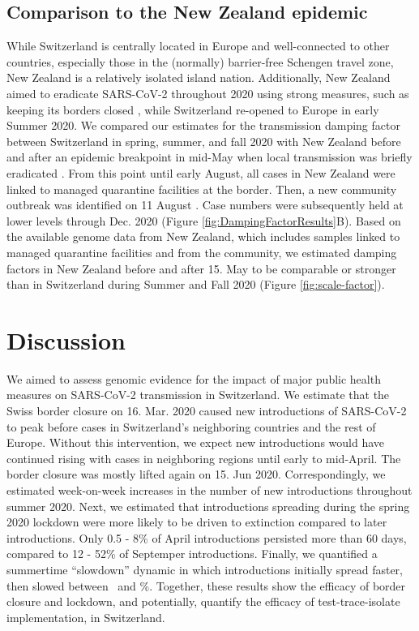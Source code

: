 \documentclass[11pt,twoside,lineno]{pnas-new} %
\begin{document}
\subsection{Comparison to the New Zealand epidemic}
While Switzerland is centrally located in Europe and well-connected to other countries, especially those in the (normally) barrier-free Schengen travel zone, New Zealand is a relatively isolated island nation. Additionally, New Zealand aimed to eradicate SARS-CoV-2 throughout 2020 using strong measures, such as keeping its borders closed \cite{ZL-covid-policies}, while Switzerland re-opened to Europe in early Summer 2020. We compared our estimates for the transmission damping factor between Switzerland in spring, summer, and fall 2020 with New Zealand before and after an epidemic breakpoint in mid-May when local transmission was briefly eradicated \cite{Geoghegan2020}. From this point until early August, all cases in New Zealand were linked to managed quarantine facilities at the border. Then, a new community outbreak was identified on 11 August \cite{Geoghegan2021-nzl-outbreak}. Case numbers were subsequently held at lower levels through Dec. 2020 (Figure \ref{fig:DampingFactorResults}B). Based on the available genome data from New Zealand, which includes samples linked to managed quarantine facilities and from the community, we estimated damping factors in New Zealand before and after 15. May to be comparable or stronger than in Switzerland during Summer and Fall 2020 (Figure \ref{fig:scale-factor}).

\section{Discussion}
We aimed to assess genomic evidence for the impact of major public health measures on SARS-CoV-2 transmission in Switzerland. We estimate that the Swiss border closure on 16. Mar. 2020 caused new introductions of SARS-CoV-2 to peak before cases in Switzerland's neighboring countries and the rest of Europe. Without this intervention, we  expect new introductions would have continued rising with cases in neighboring regions until early to mid-April. The border closure was mostly lifted again on 15. Jun 2020. Correspondingly, we estimated week-on-week increases in the number of new introductions throughout summer 2020. Next, we estimated that introductions spreading during the spring 2020 lockdown were more likely to be driven to extinction compared to later introductions. Only 0.5 - 8\% of April introductions persisted more than 60 days, compared to 12 - 52\% of Septemper introductions. Finally, we quantified a summertime ``slowdown'' dynamic in which introductions initially spread faster, then slowed between \summermaxdampingpercentmedianCHEnosampUB\ and \summermindampingpercentmedianCHEnosampUB \%. Together, these results show the efficacy of border closure and lockdown, and potentially, quantify the efficacy of test-trace-isolate implementation, in Switzerland.
\end{document}
